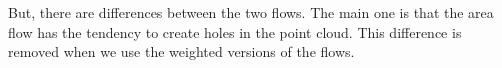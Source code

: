 But, there are differences between the two flows. The main one is that the area
flow has the tendency to create holes in the point cloud. This difference is
removed when we use the weighted versions of the flows.






